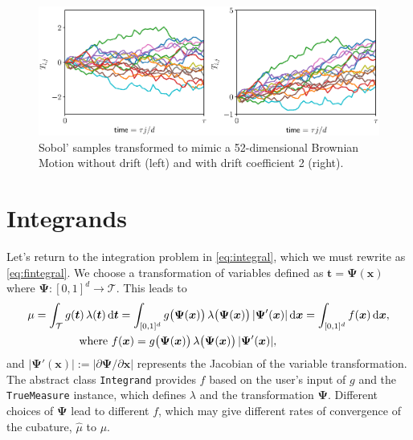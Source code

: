 \documentclass[graybox]{svmult}
\begin{document}
\begin{figure}[t]
	\includegraphics[width=1\textwidth]{QMCSoftwareArticle/vfigs/tm_bm.eps} 
	\caption{Sobol' samples transformed to mimic a 52-dimensional Brownian Motion without drift (left) and with drift coefficient 2 (right).}
	\label{fig:tm_bm}
\end{figure}

\section{Integrands}

Let's return  to the integration problem in \eqref{eq:integral}, which we must rewrite as \eqref{eq:fintegral}.  We choose a transformation of variables defined as $\boldsymbol{t} = \boldsymbol{\Psi}(\boldsymbol{x})$ where $\boldsymbol{\Psi}:[0,1]^d \to \mathcal{T}$.  This leads to 
\begin{align}
	\nonumber 
 \mu &= \int_\mathcal{T} g(\boldsymbol{t}) \, \lambda(\boldsymbol{t}) \, \D \boldsymbol{t}  = \int_{[0,1]^d} g\bigl(\boldsymbol{\Psi}(\boldsymbol{x})\bigr) \, \lambda\bigl(\boldsymbol{\Psi}(\boldsymbol{x})\bigr) \,\lvert \boldsymbol{\Psi}'(\boldsymbol{x})\rvert  \, \D \boldsymbol{x} =  \int_{[0,1]^d}f(\boldsymbol{x}) \, \D \boldsymbol{x},  \\
 \label{eq:transVar}
  & \qquad \qquad \text{where } f(\boldsymbol{x})  = g\bigl(\boldsymbol{\Psi}(\boldsymbol{x})\bigr)  \, \lambda\bigl(\boldsymbol{\Psi}(\boldsymbol{x})\bigr) \,\lvert \boldsymbol{\Psi}'(\boldsymbol{x})\rvert ,
\end{align}
and $\lvert \boldsymbol{\Psi}'(\boldsymbol{x})\rvert := \lvert \partial \boldsymbol{\Psi}/\partial \boldsymbol{x}\rvert$ represents the Jacobian of the variable transformation.  The abstract class \texttt{Integrand} provides $f$ based on the user's input of $g$ and the \texttt{TrueMeasure} instance, which defines $\lambda$ and the transformation $\boldsymbol{\Psi}$. Different choices of $\boldsymbol{\Psi}$ lead to different $f$, which may give different rates of convergence of the cubature, $\widehat{\mu}$ to $\mu$.
\end{document}
